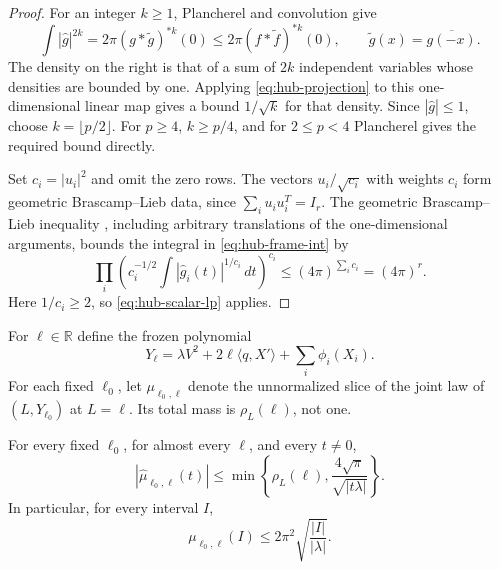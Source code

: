 \begin{proof}
For an integer $k\ge1$, Plancherel and convolution give
\[
 \int|\widehat g|^{2k}
 =2\pi(g*\widetilde g)^{*k}(0)
 \le2\pi(f*\widetilde f)^{*k}(0),
 \qquad \widetilde g(x)=\overline{g(-x)}.
\]
The density on the right is that of a sum of $2k$ independent variables
whose densities are bounded by one.  Applying
\eqref{eq:hub-projection} to this one-dimensional linear map gives a
bound $1/\sqrt k$ for that density.  Since $|\widehat g|\le1$, choose
$k=\lfloor p/2\rfloor$.  For $p\ge4$, $k\ge p/4$, and for
$2\le p<4$ Plancherel gives the required bound directly.

Set $c_i=|u_i|^2$ and omit the zero rows.  The vectors
$u_i/\sqrt{c_i}$ with weights $c_i$ form geometric
Brascamp--Lieb data, since $\sum_i u_i u_i^T=I_r$.
The geometric Brascamp--Lieb inequality
\citep{BL1976,Ball1986,Barthe1998}, including arbitrary translations of
the one-dimensional arguments, bounds the integral in
\eqref{eq:hub-frame-int} by
\[
 \prod_i\left(c_i^{-1/2}
          \int|\widehat g_i(t)|^{1/c_i}\,dt\right)^{c_i}
 \le(4\pi)^{\sum_i c_i}=(4\pi)^r.
\]
Here $1/c_i\ge2$, so \eqref{eq:hub-scalar-lp} applies.
\end{proof}

For $\ell\in\mathbb R$ define the frozen polynomial
\[
 Y_\ell=\lambda V^2+2\ell\langle q,X'\rangle
                         +\sum_i\phi_i(X_i).
\]
For each fixed $\ell_0$, let $\mu_{\ell_0,\ell}$ denote the
unnormalized slice of the joint law of $(L,Y_{\ell_0})$ at $L=\ell$.
Its total mass is $\rho_L(\ell)$, not one.

\begin{lemma}\label{lem:hub-frozen}
For every fixed $\ell_0$, for almost every $\ell$, and every $t\ne0$,
\begin{equation}\label{eq:hub-slice-fourier}
 |\widehat\mu_{\ell_0,\ell}(t)|
 \le\min\left\{\rho_L(\ell),
                   \frac{4\sqrt\pi}{\sqrt{|t\lambda|}}\right\}.
\end{equation}
In particular, for every interval $I$,
\begin{equation}\label{eq:hub-slice-interval}
 \mu_{\ell_0,\ell}(I)
       \le2\pi^2\sqrt{\frac{|I|}{|\lambda|}}.
\end{equation}
\end{lemma}

